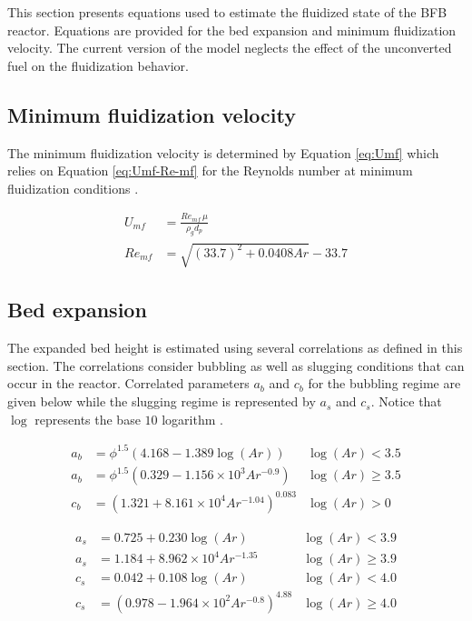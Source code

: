 \documentclass[12pt,titlepage]{article}
\begin{document}
This section presents equations used to estimate the fluidized state of the BFB reactor. Equations are provided for the bed expansion and minimum fluidization velocity. The current version of the model neglects the effect of the unconverted fuel on the fluidization behavior.

\subsection{Minimum fluidization velocity}

The minimum fluidization velocity is determined by Equation \ref{eq:Umf} which relies on Equation \ref{eq:Umf-Re-mf} for the Reynolds number at minimum fluidization conditions \cite{Wen-1966}.

\begin{align}
    U_{mf} &= \frac{Re_{mf}\,\mu}{\rho_g d_p} \label{eq:Umf} \\
    Re_{mf} &= \sqrt{(33.7)^2 + 0.0408 Ar} - 33.7 \label{eq:Umf-Re-mf}
\end{align}

\subsection{Bed expansion}

The expanded bed height is estimated using several correlations as defined in this section. The correlations consider bubbling as well as slugging conditions that can occur in the reactor. Correlated parameters $a_b$ and $c_b$ for the bubbling regime are given below while the slugging regime is represented by $a_s$ and $c_s$. Notice that $\log$ represents the base $10$ logarithm \cite{Agu-2018}.

\begin{align}
    a_b &= \phi^{1.5} (4.168 - 1.389 \log(Ar))            & \log(Ar) < 3.5 \\
    a_b &= \phi^{1.5} (0.329 - 1.156\times10^3 Ar^{-0.9}) & \log(Ar) \geq 3.5\\
    c_b &= (1.321 + 8.161\times10^4 Ar^{-1.04})^{0.083}   & \log(Ar) > 0
\end{align}

\begin{align}
    a_s &= 0.725 + 0.230 \log(Ar)                     & \log(Ar) < 3.9 \\
    a_s &= 1.184 + 8.962\times10^4 Ar^{-1.35}         & \log(Ar) \geq 3.9 \\
    c_s &= 0.042 + 0.108 \log(Ar)                     & \log(Ar) < 4.0 \\
    c_s &= (0.978 - 1.964\times10^2 Ar^{-0.8})^{4.88} & \log(Ar) \geq 4.0
\end{align}
\end{document}
